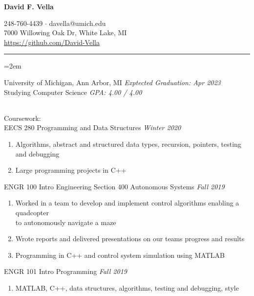 \documentclass[12pt]{article}
\newcommand{\rheader}[1] { 
    \noindent{ \large \textbf{#1} \par }
    \vspace{-10pt}
    \noindent \rule{7.5in}{0.5pt} 
}
\newcommand{\rdate}[1]{
    \hfill \textit{#1}
}
\newcommand{\ritem} {
    \vspace{-10pt} \item
}
\newcommand{\rurl}[1] {
	\textcolor{blue}{\small{\uline{\url{#1}}}}
}
\newenvironment{rsection} {
    \vspace{-5pt}
    \par \medskip
    \leftskip=2em
    \noindent \ignorespaces
} {
    \par \medskip
    \vspace{5pt}
}
\newenvironment{rlist} {
    \begin{enumerate}[leftmargin=0.75in, label=$\bullet$]
} {
    \end{enumerate}
    \vspace{-10pt}
}
\begin{document}
\begin{center}
    {\Large \textbf{David F. Vella} \par}
    \vspace{5pt}
    248-760-4439 $\cdot$ davella@umich.edu \\
    7000 Willowing Oak Dr, White Lake, MI \\
    \rurl{https://github.com/David-Vella}
\end{center}

\vspace{-10pt}

\rheader{EDUCATION}
\begin{rsection}
    University of Michigan, Ann Arbor, MI \rdate{Exptected Graduation: Apr 2023} \\
    Studying Computer Science \rdate{GPA: 4.00 / 4.00}
    \vspace{5pt} \\
    \noindent Coursework: \\
    EECS 280 Programming and Data Structures \rdate{Winter 2020}
    \begin{rlist}
        \ritem Algorithms, abstract and structured data types, recursion, pointers, testing and debugging
        \ritem Large programming projects in C++
    \end{rlist}
    ENGR 100 Intro Engineering Section 400 Autonomous Systems \rdate{Fall 2019}
    \begin{rlist}
        \ritem Worked in a team to develop and implement control algorithms enabling a quadcopter \\ to autonomously navigate a maze
        \ritem Wrote reports and delivered presentations on our teams progress and results
        \ritem Programming in C++ and control system simulation using MATLAB 
    \end{rlist}
    ENGR 101 Intro Programming \rdate{Fall 2019}
    \begin{rlist}
        \ritem MATLAB, C++, data structures, algorithms, testing and debugging, style 
    \end{rlist}
\end{rsection}
\end{document}
